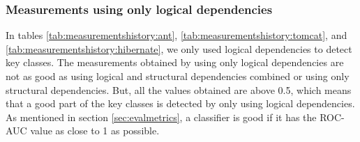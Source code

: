 \documentclass[12pt]{mitthesis}
\begin{document}
\begin{table}[!h]
\renewcommand{\arraystretch}{1}
\caption{Measurements for Hibernate using structural and logical dependencies combined}
\label{tab:measurementscombined:hibernate}
\centering
{}
\end{table}





\subsubsection{Measurements using only logical dependencies}

In tables \ref{tab:measurementshistory:ant}, \ref{tab:measurementshistory:tomcat}, and \ref{tab:measurementshistory:hibernate}, we only used logical dependencies to detect key classes. The measurements obtained by using only logical dependencies are not as good as using logical and structural dependencies combined or using only structural dependencies. But, all the values obtained are above 0.5, which means that a good part of the key classes is detected by only using logical dependencies.  As mentioned in section \ref{sec:evalmetrics}, a classifier is good if it has the ROC-AUC value as close to 1 as possible. 
\end{document}
